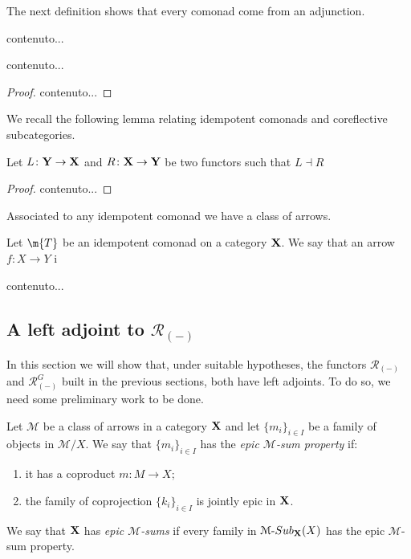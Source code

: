 \documentclass[a4paper,UKenglish,cleveref,pdftex,thm-restate,numberwithinsect]{lipics-v2021}
\def\X{\textbf {\textup{X}}}
\def\Y{\textbf {\textup{Y}}}
\newcommand{\sub}[3]{{\mathcal{#1}}\textrm{-}\mathsf{Sub}_{\textbf {\textup{#2}}}(#3)}
\begin{document}
The next definition shows that every comonad come from an adjunction.

\begin{definition}
	contenuto...
\end{definition}

\begin{proposition}
	contenuto...
\end{proposition}
\begin{proof}
	contenuto...
\end{proof}


We recall the following lemma relating idempotent comonads and coreflective subcategories.

\begin{lemma}\label{lem:comsub}
	Let $L\colon \Y\to \X$ and $R\colon \X \to \Y$ be two functors such that $L\dashv R$
\end{lemma}
\begin{proof}
	contenuto...
\end{proof}

Associated to any idempotent comonad we have a class of arrows.

\begin{definition}
	Let $\m{T}$ be an idempotent comonad on a category $\X$. We say that an arrow $f:X\to Y$ i
\end{definition}
\begin{remark}
	contenuto...
\end{remark}
\fi 


\subsection{A left adjoint to $\mathcal{R}_{(-)}$}

In this section we will show that, under suitable hypotheses, the functors $\mathcal{R}_{(-)}$ and $\mathcal{R}^G_{(-)}$ built in the previous sections, both have left adjoints. To do so, we need some preliminary work to be done.


\begin{definition}
	Let $\mathcal{M}$ be a class of arrows in a category $\X$ and let $\{m_i\}_{i\in I}$ be a family of objects in $\mathcal{M}/X$. We say that $\{m_i\}_{i\in I}$ has the \emph{epic $\mathcal{M}$-sum property} if:
	\begin{enumerate}
		\item it has a  coproduct $m\colon M\to X$;
		\item the family  of coprojection $\{k_i\}_{i\in I}$ is jointly epic in $\X$.
	\end{enumerate}
	
	We say that $\X$ has \emph{epic $\mathcal{M}$-sums} if every family in $\sub{M}{X}{X}$ has the epic $\mathcal{M}$-sum property.
\end{definition}
\end{document}
